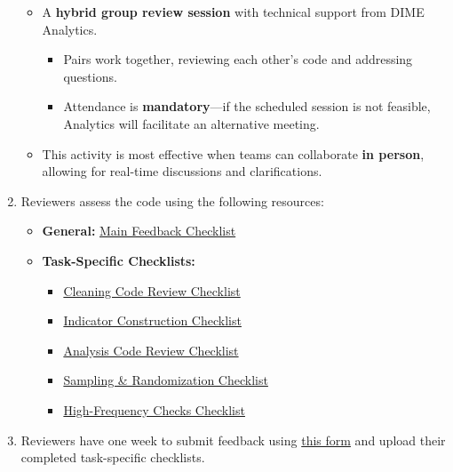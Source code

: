 \documentclass{tufte-handout}
\begin{document}
\begin{fullwidth}
\begin{enumerate}
\begin{itemize}
        \item A \textbf{hybrid group review session} with technical support from DIME Analytics.
        \begin{itemize}
            \item Pairs work together, reviewing each other's code and addressing questions.
            \item Attendance is \textbf{mandatory}—if the scheduled session is not feasible, Analytics will facilitate an alternative meeting.
        \end{itemize}
        \item This activity is most effective when teams can collaborate \textbf{in person}, allowing for real-time discussions and clarifications.
    \end{itemize}
    \item Reviewers assess the code using the following resources:
    \begin{itemize}
        \item \textbf{General:} \href{https://github.com/worldbank/dime-standards/blob/master/dime-coding-standards/checklists/Reviewer%20Feedback%20Checklist.pdf}{Main Feedback Checklist}
        \item \textbf{Task-Specific Checklists:}
        \begin{itemize}
            \item \href{https://github.com/worldbank/dime-standards/blob/d9111654531319fe96095d4bf0acf7fa0b66bacd/dime-coding-standards/checklists/Cleaning%20Code%20Review%20Checklist.pdf}{Cleaning Code Review Checklist}
            \item \href{https://github.com/worldbank/dime-standards/blob/d9111654531319fe96095d4bf0acf7fa0b66bacd/dime-coding-standards/checklists/Construction%20Code%20Review%20Checklist.pdf}{Indicator Construction Checklist}
            \item \href{https://github.com/worldbank/dime-standards/blob/d9111654531319fe96095d4bf0acf7fa0b66bacd/dime-coding-standards/checklists/Analysis%20Code%20Review%20Checklist.pdf}{Analysis Code Review Checklist}
            \item \href{https://github.com/worldbank/dime-standards/blob/d9111654531319fe96095d4bf0acf7fa0b66bacd/dime-coding-standards/checklists/Sampling%20and%20Random%20Treatment%20Assignment%20Checklist.pdf}{Sampling \& Randomization Checklist}
            \item \href{https://github.com/worldbank/dime-standards/blob/d9111654531319fe96095d4bf0acf7fa0b66bacd/dime-coding-standards/checklists/HFCs%20Checklist.pdf}{High-Frequency Checks Checklist}
        \end{itemize}
    \end{itemize}
    \item Reviewers have one week to submit feedback using \href{https://survey.wb.surveycto.com/collect/code_review_summary?caseid=}{this form} and upload their completed task-specific checklists.
\end{enumerate}


\end{fullwidth}
\end{document}
